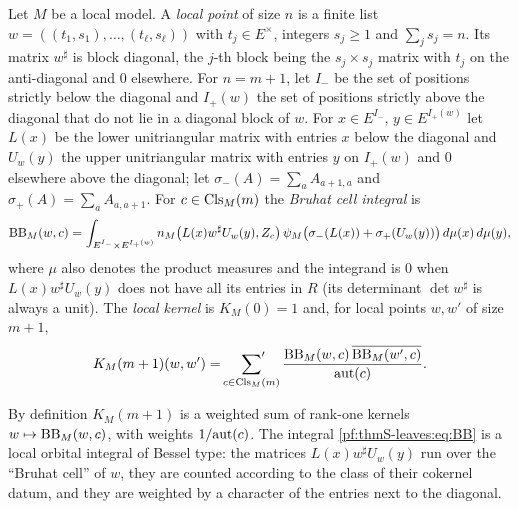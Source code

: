 \begin{definition}\label{pf:thmS-leaves:def:localkernel}
Let $M$ be a local model. A \emph{local point} of size $n$ is a finite list $w=((t_1,s_1),\dots,(t_\ell,s_\ell))$
with $t_j\in E^\times$, integers $s_j\ge1$ and $\sum_js_j=n$. Its matrix $w^\sharp$ is block diagonal, the $j$-th
block being the $s_j\times s_j$ matrix with $t_j$ on the anti-diagonal and $0$ elsewhere. For $n=m+1$, let
$I_-$ be the set of positions strictly below the diagonal and $I_+(w)$ the set of positions strictly above the
diagonal that do not lie in a diagonal block of $w$. For $x\in E^{I_-}$, $y\in E^{I_+(w)}$ let $L(x)$ be the
lower unitriangular matrix with entries $x$ below the diagonal and $U_w(y)$ the upper unitriangular matrix with
entries $y$ on $I_+(w)$ and $0$ elsewhere above the diagonal; let $\sigma_-(A)=\sum_aA_{a+1,a}$ and
$\sigma_+(A)=\sum_aA_{a,a+1}$. For $c\in\mathrm{Cls}_M(m)$ the \emph{Bruhat cell integral} is
\begin{equation}\label{pf:thmS-leaves:eq:BB}
\mathrm{BB}_M(w,c)=\int_{E^{I_-}\times E^{I_+(w)}}n_M\bigl(L(x)w^\sharp U_w(y),Z_c\bigr)\,
\psi_M\bigl(\sigma_-(L(x))+\sigma_+(U_w(y))\bigr)\,d\mu(x)\,d\mu(y),
\end{equation}
where $\mu$ also denotes the product measures and the integrand is $0$ when $L(x)w^\sharp U_w(y)$ does not have all
its entries in $R$ (its determinant $\det w^\sharp$ is always a unit). The \emph{local kernel} is $K_M(0)=1$ and,
for local points $w,w'$ of size $m+1$,
\begin{equation}\label{pf:thmS-leaves:eq:Kk}
K_M(m+1)(w,w')=\sideset{}{'}\sum_{c\in\mathrm{Cls}_M(m)}
\frac{\mathrm{BB}_M(w,c)\,\overline{\mathrm{BB}_M(w',c)}}{\mathrm{aut}(c)} .
\end{equation}
\end{definition}

\begin{remark}\label{pf:thmS-leaves:rem:Kk}
By definition $K_M(m+1)$ is a weighted sum of rank-one kernels $w\mapsto\mathrm{BB}_M(w,c)$, with weights
$1/\mathrm{aut}(c)$. The integral \eqref{pf:thmS-leaves:eq:BB} is a local orbital integral of Bessel type: the
matrices $L(x)w^\sharp U_w(y)$ run over the ``Bruhat cell'' of $w$, they are counted according to the class of their
cokernel datum, and they are weighted by a character of the entries next to the diagonal.
\end{remark}


